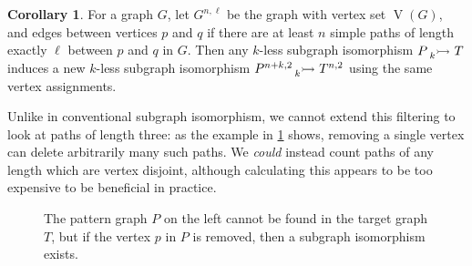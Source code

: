\documentclass[letterpaper]{article}
\theoremstyle{definition}
\newtheorem{corollary}{Corollary}
\newcommand{\lessnonind}[1]{\prescript{}{#1}{\rightarrowtail}\ }
\newcommand{\V}{\operatorname{V}}
\begin{document}
\begin{corollary}\label{corollary:supplemental}
    For a graph $G$, let $G^{n, \ell}$ be the graph with vertex set $\V(G)$, and edges between vertices $p$ and $q$ if there are at least $n$ simple paths of
    length exactly $\ell$ between $p$ and $q$ in $G$. Then any $k$-less subgraph isomorphism
    $P \lessnonind{k} T$ induces a new $k$-less subgraph isomorphism
    $P^{n+k, 2}\lessnonind{k} T^{n, 2}$ using the same vertex assignments.
\end{corollary}

Unlike in conventional subgraph isomorphism, we cannot extend this filtering to look at paths of
length three: as the example in \cref{figure:pathlength3example} shows, removing a single vertex can
delete arbitrarily many such paths. We \emph{could} instead count paths of any length which are
vertex disjoint, although calculating this appears to be too expensive to be beneficial in practice.

\begin{figure}[tb]
    \centering
    \caption{The pattern graph $P$ on the left cannot be found in the target graph $T$, but if
    the vertex $p$ in $P$ is removed, then a subgraph isomorphism exists.}
    \label{figure:pathlength3example}
\end{figure}
\end{document}

